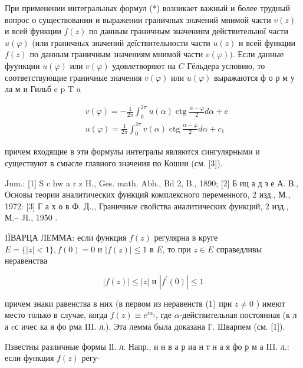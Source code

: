 \documentclass[10pt]{article}
\begin{document}
При применении интегральных формул (*) возникает важный и более трудный вопрос о существовании и выражении граничных значений мнимой части $v(z)$ и всей функции $f(z)$ по данным граничным значениям действительної части $u(\varphi)$ (или граничных значений деїствительности части $u(z)$ и всей функции $f(z)$ по данным граничным значениям мнимой части $v(\varphi))$. Если данные фуункции $u(\varphi)$ или $v(\varphi)$ удовлетворяют на $C$ Гёльдера условию, то соответствующие граничные значения $v(\varphi)$ или $u(\varphi)$ выражаются ф о р м у ла м и Гильб e p T a



\[

\begin{aligned}

& v(\varphi)=-\frac{1}{2 \pi} \int_{0}^{2 \pi} u(\alpha) \operatorname{ctg} \frac{\alpha-\varphi}{2} d \alpha+c \\

& u(\varphi)=\frac{1}{2 \pi} \int_{0}^{2 \pi} v(\alpha) \operatorname{ctg} \frac{\alpha-\varphi}{2} d \alpha+c_{1}

\end{aligned}

\]



причем входящие в эти формулы интегралы являются сингулярными и существуют в смысле главного значения по Кошии (см. [3]).



Jum.: [1] S c hw a r z H., Ges. math. Abh., Bd 2, B., 1890; [2] Б иц а д з е А. В., Основы теории аналитических функций комплексного переменного, 2 изд., М., 1972: [3] Г а х о в Ф. Д.,, Граничные свойства аналитических функций, 2 изд., М.-- JI., 1950 .



IÏВАРЦА ЛЕММА: если функция $f(z)$ регулярна в круге $E=\{|z|<1\}, f(0)=0$ и $|f(z)| \leqslant 1$ в $E$, то при $z \in E$ справедливы неравенства



\[

|f(z)| \leqslant|z| \text { и }\left|f^{\prime}(0)\right| \leqslant 1

\]



причем знаки равенства в них (в первом из неравенств (1) при $z \neq 0$ ) имеют место только в случае, когда $f(z) \equiv e^{i \alpha_{z}}$, где $\alpha$-действительная постоянная (к л а cс ичес ка я фо рма III. л.). Эта лемма была доказана Г. Шварпем (см. [1]).



Пзвестны различные формы ІІ. л. Напр., и н в а р иа н т н а я фо р м а III. л.: если функция $f(z)$ регу-
\end{document}
